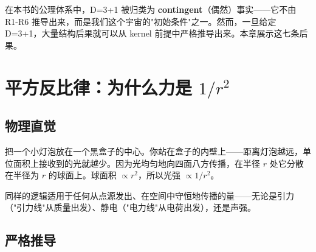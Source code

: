\begin{notebox}
  在本书的公理体系中，D=3+1 被归类为 \textbf{contingent}（偶然）事实——它不由 R1-R6 推导出来，而是我们这个宇宙的"初始条件"之一。然而，一旦给定 D=3+1，大量结构后果就可以从 kernel 前提中严格推导出来。本章展示这七条后果。
\end{notebox}

\section{平方反比律：为什么力是 $1/r^2$}

\subsection{物理直觉}

把一个小灯泡放在一个黑盒子的中心。你站在盒子的内壁上——距离灯泡越远，单位面积上接收到的光就越少。因为光均匀地向四面八方传播，在半径 $r$ 处它分散在半径为 $r$ 的球面上。球面积 $\propto r^2$，所以光强 $\propto 1/r^2$。

同样的逻辑适用于任何从点源发出、在空间中守恒地传播的量——无论是引力（"引力线"从质量出发）、静电（"电力线"从电荷出发），还是声强。

\subsection{严格推导}

